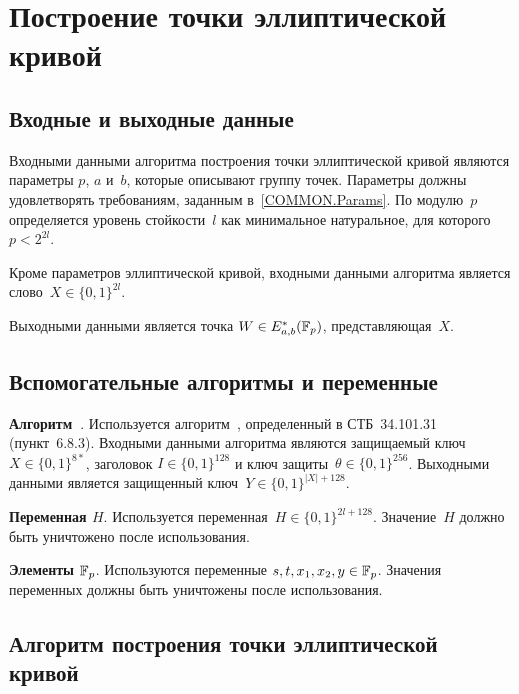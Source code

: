 \section{Построение точки эллиптической кривой}\label{SWU}

\subsection{Входные и выходные данные}

Входными данными алгоритма построения точки эллиптической кривой
являются параметры $p$, $a$ и~$b$, которые описывают группу точек. 
Параметры должны удовлетворять требованиям, 
заданным в~\ref{COMMON.Params}. 
По модулю~$p$ определяется уровень стойкости~$l$ как минимальное 
натуральное, для которого~$p<2^{2l}$.

Кроме параметров эллиптической кривой,
входными данными алгоритма является слово~$X\in\{0,1\}^{2l}$.

Выходными данными является точка $W\in E_{a,b}^*(\mathbb{F}_p)$, 
представляющая~$X$.

\subsection{Вспомогательные алгоритмы и переменные}

{\bf Алгоритм~}.
Используется алгоритм~,
определенный в СТБ~34.101.31 (пункт~6.8.3).
Входными данными алгоритма являются
защищаемый ключ~$X\in\{0,1\}^{8*}$, заголовок $I\in\{0,1\}^{128}$
и ключ защиты~$\theta\in\{0,1\}^{256}$.
Выходными данными является
защищенный ключ~$Y\in\{0,1\}^{|X|+128}$.

{\bf Переменная $H$}.
Используется переменная~$H\in\{0,1\}^{2l+128}$.
Значение~$H$ должно быть уничтожено после использования.

{\bf Элементы $\mathbb{F}_p$}.
Используются переменные $s,t,x_1,x_2,y\in\mathbb{F}_p$.
Значения переменных должны быть уничтожены после использования.

\subsection{Алгоритм построения точки эллиптической кривой}\label{SWU.Alg}

